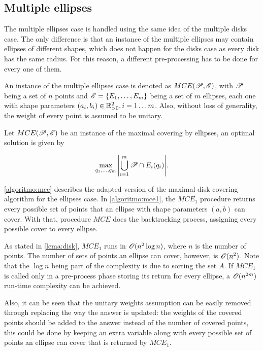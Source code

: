 \subsection{Multiple ellipses}

The multiple ellipses case is handled using the same idea of the multiple disks case. The only difference is that an instance of the multiple ellipses may contain ellipses of different shapes, which does not happen for the disks case as every disk has the same radius. For this reason, a different pre-processing has to be done for every one of them.

An instance of the multiple ellipses case is denoted as $MCE(\mathscr{P}, \mathscr{E})$, with $\mathscr{P}$ being a set of $n$ points and $\mathscr{E} = \{E_1, \dots, E_m\}$ being a set of $m$ ellipses, each one with shape parameters $(a_i, b_i) \in \mathbb{R}^2_{>0}, i = 1 \dots m$. Also, without loss of generality, the weight of every point is assumed to be unitary.

\begin{definicao}
Let $MCE(\mathscr{P}, \mathscr{E})$ be an instance of the maximal covering by ellipses, an optimal solution is given by

\begin{equation}
    \max_{q_1, \dots, q_m}{\left|\bigcup_{i=1}^{m} \mathscr{P} \cap E_i(q_i)\right|}.
\end{equation}
\end{definicao}

\autoref{algoritmo:mce} describes the adapted version of the maximal disk covering algorithm for the ellipses case. In \autoref{algoritmo:mce1}, the $MCE_1$ procedure returns every possible set of points that an ellipse with shape parameters $(a,b)$ can cover. With that, procedure $MCE$ does the backtracking process, assigning every possible cover to every ellipse.

As stated in \autoref{lema:disk}, $MCE_1$ runs in $\mathscr{O}(n^2\log{n})$, where $n$ is the number of points. The number of sets of points an ellipse can cover, however, is $\mathscr{O}(n^2)$. Note that the $\log{n}$ being part of the complexity is due to sorting the set $A$. If $MCE_1$ is called only in a pre-process phase storing its return for every ellipse, a $\mathscr{O}(n^{2m})$ run-time complexity can be achieved. 

Also, it can be seen that the unitary weights assumption can be easily removed through replacing the way the answer is updated: 
the weights of the covered points should be added to the answer instead of the number of covered points, this could be done by keeping an extra variable along with every possible set of points an ellipse can cover that is returned by $MCE_1$.

